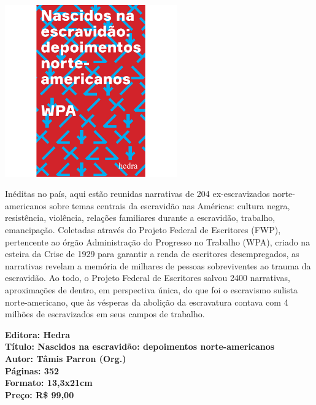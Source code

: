 \pagebreak

\begin{center}
\hspace*{-3.6cm}
\hspace*{3.1cm}\includegraphics[width=74mm]{./grid/nascidos.png}
\end{center}

\hspace*{-7cm}\hrulefill\hspace*{-7cm}

\medskip

\noindent{}Inéditas no país, aqui estão reunidas narrativas de 204 ex-escravizados norte-americanos sobre temas centrais da escravidão nas Américas: cultura negra, resistência, violência, relações familiares durante a escravidão, trabalho, emancipação.
Coletadas através do Projeto Federal de Escritores (FWP), pertencente ao órgão Administração do Progresso no Trabalho (WPA), criado na esteira da Crise de 1929 para garantir a renda de escritores desempregados, as narrativas revelam a memória de milhares de pessoas sobreviventes ao trauma da escravidão. Ao todo, o Projeto Federal de Escritores salvou 2400 narrativas, aproximações de dentro, em perspectiva única, do que foi o escravismo sulista norte-americano, que às vésperas da abolição da escravatura contava com 4 milhões de escravizados em seus campos de trabalho.

\vfill

\noindent\begin{minipage}[c]{1\linewidth}
{\small\textbf{
\hspace*{-.1cm}Editora: Hedra\\
Título: Nascidos na escravidão: depoimentos norte-americanos\\
Autor: Tâmis Parron (Org.)\\ 
Páginas: 352\\
Formato: 13,3x21cm\\
Preço: R\$ 99,00\\
}}
\end{minipage}

